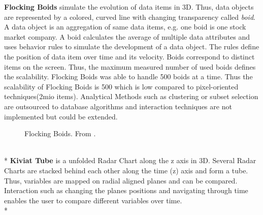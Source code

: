\textbf{Flocking Boids}  simulate the evolution of data items in 3D. Thus, data objects are represented by a colored, curved line with changing transparency called \textit{boid}.  A data object is an aggregation of same data items, e.g. one boid is one stock market company. A boid calculates the average of multiple data attributes and uses behavior rules to simulate the development of a data object. The rules define the position of data item over time and its velocity. Boids correspond to distinct items on the screen. Thus, the maximum measured number of used boids defines the scalability. Flocking Boids was able to handle 500 boids at a time. Thus the scalability of Flocking Boids is 500 which is low compared to pixel-oriented techniques(2mio items)\cite{Moere2004}. 
Analytical Methods such as clustering or subset selection are outsourced to database algorithms and interaction techniques are not implemented but could be extended\cite{Moere2004}.
\begin{figure}[H]
    \centering
    \caption{Flocking Boids. From \cite{Aigner2011}.}
    \label{fig:flockingboids}
\end{figure}
\\*
\textbf{Kiviat Tube} is a unfolded Radar Chart along the z axis in 3D. Several Radar Charts are stacked behind each other along the time (z) axis and form a tube. Thus, variables are mapped on radial aligned planes and can be compared. Interaction such as changing the planes positions and navigating through time enables the user to compare different variables over time.\\*

